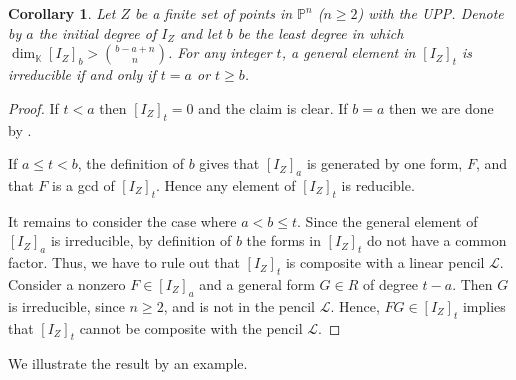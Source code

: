 \documentclass[12pt]{amsart}%
\numberwithin{equation}{section}
\newtheorem{corollary}[theorem]{Corollary}
\theoremstyle{definition}
\numberwithin{equation}{section}
\begin{document}
\begin{corollary}
\label{UPP cor}
    Let $Z$ be a finite set of points in $\mathbb P^n$ ($n \ge 2$) with the UPP. Denote by $a$ the initial degree of $I_Z$ and let $b$ be the least degree in which $\dim_{\mathbb K} [I_Z]_b > \binom{b-a +n}{n}$.  
For any integer $t$, a general element in $[I_Z]_t$ is irreducible if and only if $t = a$ or $t \ge b$. 
\end{corollary}

\begin{proof} 
If $t < a$ then $[I_Z]_t = 0$ and the claim is clear. 
If $b = a$ then we are done by . 

If $a \le t < b$, the definition of $b$ gives that $ [I_Z]_a$ is generated by one form, $F$, and that $F$ is a gcd of $ [I_Z]_t$. Hence any element of $ [I_Z]_t$ is reducible. 

It remains to consider the case where $a < b \le t$. {Since the general element of $[I_Z]_a$ is irreducible,}
by definition of $b$ the forms in 
$[I_Z]_t$ do not have a common factor. Thus, we have to rule out that $[I_Z]_t$ is composite with a linear pencil 
$\mathcal{L}$. Consider a nonzero $F \in [I_Z]_a$ and a general form $G \in R$ of degree $t - a$. Then $G$ is irreducible, since $n \ge 2$, and is not in the pencil $\mathcal{L}$. Hence, $FG \in [I_Z]_t$ implies that $[I_Z]_t$ cannot be composite with the pencil $\mathcal{L}$. 
\end{proof}

We illustrate the result by an example. 
\end{document}
